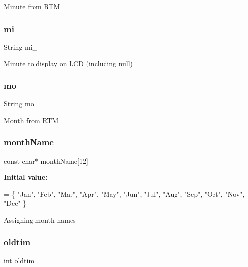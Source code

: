 Minute from R\+TM \mbox{\label{_w_s_8ino_a941e7622afb12acf931c6da1910cc461}} 
\subsubsection{\texorpdfstring{mi\+\_}{mi\_0}}
{\footnotesize\ttfamily String mi\+\_}

Minute to display on L\+CD (including null) \mbox{\label{_w_s_8ino_ae87a77f51d231ab5614fdc0cc9734ae9}} 
\subsubsection{\texorpdfstring{mo}{mo}}
{\footnotesize\ttfamily String mo}

Month from R\+TM \mbox{\label{_w_s_8ino_a9fce7af8b9842b4ab3b85327b1af13fc}} 
\subsubsection{\texorpdfstring{month\+Name}{monthName}}
{\footnotesize\ttfamily const char$\ast$ month\+Name\mbox{[}12\mbox{]}}

{\bfseries Initial value\+:}
\begin{DoxyCode}
= \{
  \textcolor{stringliteral}{"Jan"}, \textcolor{stringliteral}{"Feb"}, \textcolor{stringliteral}{"Mar"}, \textcolor{stringliteral}{"Apr"}, \textcolor{stringliteral}{"May"}, \textcolor{stringliteral}{"Jun"},
  \textcolor{stringliteral}{"Jul"}, \textcolor{stringliteral}{"Aug"}, \textcolor{stringliteral}{"Sep"}, \textcolor{stringliteral}{"Oct"}, \textcolor{stringliteral}{"Nov"}, \textcolor{stringliteral}{"Dec"}
\}
\end{DoxyCode}
Assigning month names \mbox{\label{_w_s_8ino_a8455abbfc4590d0bf845dcd30505e1ce}} 
\subsubsection{\texorpdfstring{oldtim}{oldtim}}
{\footnotesize\ttfamily int oldtim}

